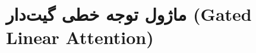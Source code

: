 \section{ماژول توجه خطی گیت‌دار (Gated Linear Attention)}
\label{sec:module_gated_linear_attention}
